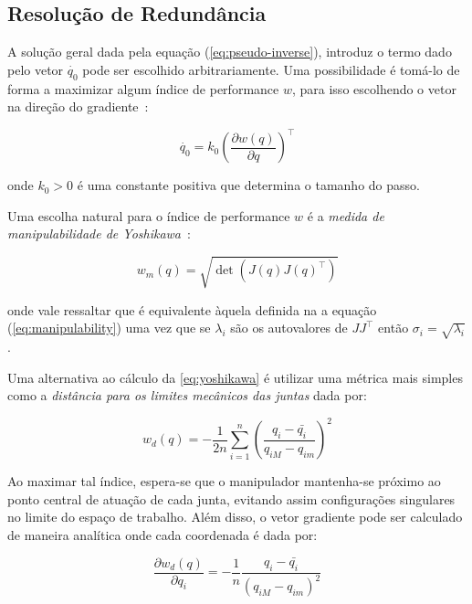 \subsection{Resolução de Redundância}

A solução geral dada pela equação (\ref{eq:pseudo-inverse}),
introduz o termo dado pelo vetor \(\dot{q_0}\) pode ser escolhido arbitrariamente. Uma
possibilidade é tomá-lo de forma a maximizar algum índice de performance \(w\),
para isso escolhendo o vetor na direção do gradiente~\cite{siciliano_robotics_2009}:

\begin{equation}\label{eq:metric-gradient}
    \dot{q_0} = k_0 {\left( \frac{\partial w(q)}{\partial q} \right)}^\top
\end{equation}

onde \(k_0 > 0\) é uma constante positiva que determina o tamanho do passo.

Uma escolha natural para o índice de performance \(w\) é a \emph{medida de
    manipulabilidade de Yoshikawa}~\cite{yoshikawa1983}:

\begin{equation}\label{eq:yoshikawa}
    w_m(q) = \sqrt{\det(J(q){J(q)}^\top)}
\end{equation}

onde vale ressaltar que é equivalente àquela definida na a equação
(\ref{eq:manipulability}) uma vez que se \(\lambda_i\) são os autovalores de
\(J J^\top\) então \(\sigma_i = \sqrt{\lambda_i}\).

Uma alternativa ao cálculo da \ref{eq:yoshikawa} é utilizar uma métrica mais simples como a
\emph{distância para os limites mecânicos das juntas} dada por:

\begin{equation}
    w_d(q) = -\frac{1}{2n} \sum_{i=1}^{n}{{\left(\frac{q_i - \bar{q_i}}{q_{iM} - q_{im}}\right)}^2}
\end{equation}

Ao maximar tal índice, espera-se que o manipulador mantenha-se próximo ao ponto
central de atuação de cada junta, evitando assim configurações singulares no
limite do espaço de trabalho. Além disso, o vetor gradiente pode ser calculado
de maneira analítica onde cada coordenada é dada por:

\begin{equation}\label{eq:joint-distance-grad}
    \frac{\partial w_d(q)}{\partial q_i} = -\frac{1}{n} \frac{q_i - \bar{q_i}}{{(q_{iM} - q_{im})}^2}
\end{equation}

